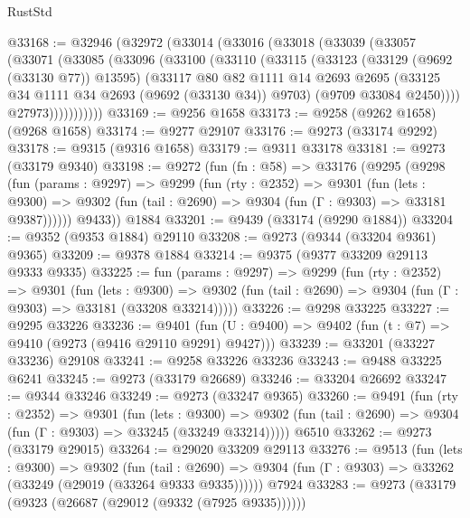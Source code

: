 \begin{lexlean}{RustStd}
\begin{coremodule}
@33168 := @32946
    (@32972
      (@33014
        (@33016
          (@33018
            (@33039
              (@33057
                (@33071
                  (@33085
                    (@33096
                      (@33100
                        (@33110
                          (@33115
                            (@33123
                              (@33129 (@9692 (@33130 @77)) @13595)
                              (@33117
                                @80
                                @82
                                @1111
                                @14
                                @2693
                                @2695
                                (@33125 @34 @1111 @34 @2693 (@9692 (@33130 @34)) @9703)
                                (@9709 @33084 @2450))))
                          @27973)))))))))))
@33169 := @9256 @1658
@33173 := @9258 (@9262 @1658) (@9268 @1658)
@33174 := @9277 @29107
@33176 := @9273 (@33174 @9292)
@33178 := @9315 (@9316 @1658)
@33179 := @9311 @33178
@33181 := @9273 (@33179 @9340)
@33198 := @9272
    (fun (fn : @58) =>
    @33176
      (@9295
        (@9298
          (fun (params : @9297) =>
          @9299
            (fun (rty : @2352) =>
            @9301
              (fun (lets : @9300) =>
              @9302 (fun (tail : @2690) => @9304 (fun (Γ : @9303) => @33181 @9387))))))
        @9433))
    @1884
@33201 := @9439 (@33174 (@9290 @1884))
@33204 := @9352 (@9353 @1884) @29110
@33208 := @9273 (@9344 (@33204 @9361) @9365)
@33209 := @9378 @1884
@33214 := @9375 (@9377 @33209 @29113 @9333 @9335)
@33225 := fun (params : @9297) =>
  @9299
    (fun (rty : @2352) =>
    @9301
      (fun (lets : @9300) =>
      @9302 (fun (tail : @2690) => @9304 (fun (Γ : @9303) => @33181 (@33208 @33214)))))
@33226 := @9298 @33225
@33227 := @9295 @33226
@33236 := @9401
    (fun (U : @9400) => @9402 (fun (t : @7) => @9410 (@9273 (@9416 @29110 @9291) @9427)))
@33239 := @33201 (@33227 @33236) @29108
@33241 := @9258 @33226 @33236
@33243 := @9488 @33225 @6241
@33245 := @9273 (@33179 @26689)
@33246 := @33204 @26692
@33247 := @9344 @33246
@33249 := @9273 (@33247 @9365)
@33260 := @9491
    (fun (rty : @2352) =>
    @9301
      (fun (lets : @9300) =>
      @9302 (fun (tail : @2690) => @9304 (fun (Γ : @9303) => @33245 (@33249 @33214)))))
    @6510
@33262 := @9273 (@33179 @29015)
@33264 := @29020 @33209 @29113
@33276 := @9513
    (fun (lets : @9300) =>
    @9302
      (fun (tail : @2690) =>
      @9304 (fun (Γ : @9303) => @33262 (@33249 (@29019 (@33264 @9333 @9335))))))
    @7924
@33283 := @9273 (@33179 (@9323 (@26687 (@29012 (@9332 (@7925 @9335))))))

\end{coremodule}
\end{lexlean}
